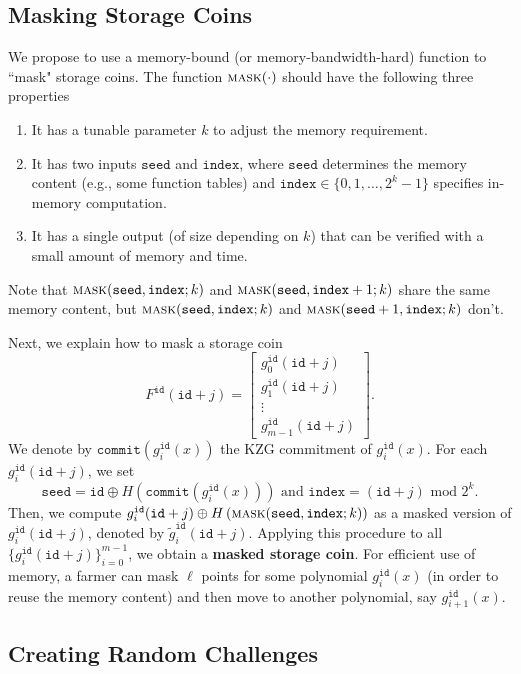 \documentclass[12pt,draftcls,onecolumn]{IEEEtran}
\newcommand{\id}{\texttt{id}}
\newcommand{\seed}{\texttt{seed}}
\newcommand{\ind}{\texttt{index}}
\newcommand{\cmt}{\texttt{commit}}
\newcommand{\mask}{\textsc{mask}}
\begin{document}
\subsection{Masking Storage Coins}

We propose to use a memory-bound (or memory-bandwidth-hard) function to ``mask" storage coins. The function $\mask(\cdot)$ should have the following three properties

\begin{enumerate}
    \item It has a tunable parameter $k$ to adjust the memory requirement. 
    \item It has two inputs $\seed$ and $\ind$, where $\seed$ determines the memory content (e.g., some function tables)
    and $\ind \in \{0, 1, \ldots, 2^k - 1 \}$ specifies in-memory computation.
    \item It has a single output (of size depending on $k$) that can be verified with a small amount of memory and time.
\end{enumerate}


Note that $\mask(\seed, \ind; k)$ and $\mask(\seed, \ind + 1; k)$ share the same memory content, but $\mask(\seed, \ind; k)$
and $\mask(\seed + 1, \ind; k)$ don't. 

Next, we explain how to mask a storage coin
\[
F^{\id}(\id + j) = \begin{bmatrix} g_0^{\id}(\id + j)\\ g_1^{\id}(\id + j)\\  \vdots \\ g_{m-1}^{\id}(\id + j) \end{bmatrix}.
\]
We denote by $\cmt\left(g_i^{\id}(x)\right)$ the KZG commitment of $g_i^{\id}(x)$.
For each $g_i^{\id}(\id + j)$, we set
\[
\seed = \id \oplus H\left( \cmt\left(g_i^{\id}(x)\right) \right) \mbox{ and } \ind = (\id + j) \mbox{ mod } 2^k.
\]
Then, we compute $g_i^{\id}(\id + j) \oplus H\left( \mask(\seed, \ind; k) \right)$ as a masked version of $g_i^{\id}(\id + j)$, denoted by $\tilde{g}_i^{\id}(\id + j)$.
Applying this procedure to all $\{ g_i^{\id}(\id + j) \}_{i = 0}^{m - 1}$, we obtain a {\bf masked storage coin}.
For efficient use of memory, a farmer can mask $\ell$ points for some polynomial $g_i^{\id}(x)$ (in order to reuse the memory content) and then move to another polynomial, say $g_{i+1}^{\id}(x)$.

\subsection{Creating Random Challenges}
\end{document}
